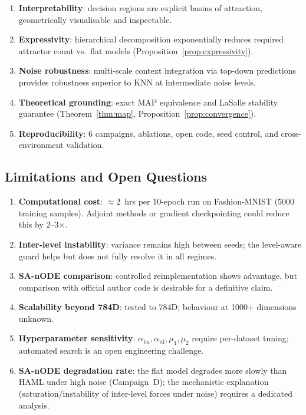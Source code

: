 \documentclass[11pt,a4paper]{article}
\begin{document}
\begin{enumerate}
  \item \textbf{Interpretability}: decision regions are explicit basins of attraction,
        geometrically visualisable and inspectable.
  \item \textbf{Expressivity}: hierarchical decomposition exponentially reduces required
        attractor count vs.\ flat models (Proposition~\ref{prop:expressivity}).
  \item \textbf{Noise robustness}: multi-scale context integration via top-down predictions
        provides robustness superior to KNN at intermediate noise levels.
  \item \textbf{Theoretical grounding}: exact MAP equivalence and LaSalle stability guarantee
        (Theorem~\ref{thm:map}, Proposition~\ref{prop:convergence}).
  \item \textbf{Reproducibility}: 6 campaigns, ablations, open code, seed control, and
        cross-environment validation.
\end{enumerate}

\subsection{Limitations and Open Questions}

\begin{enumerate}
  \item \textbf{Computational cost}: $\approx$2~hrs per 10-epoch run on Fashion-MNIST
        (5000 training samples).  Adjoint methods or gradient checkpointing could reduce
        this by 2--3$\times$.
  \item \textbf{Inter-level instability}: variance remains high between seeds; the level-aware
        guard helps but does not fully resolve it in all regimes.
  \item \textbf{SA-nODE comparison}: controlled reimplementation shows advantage, but comparison
        with official author code is desirable for a definitive claim.
  \item \textbf{Scalability beyond 784D}: tested to 784D; behaviour at 1000$+$ dimensions unknown.
  \item \textbf{Hyperparameter sensitivity}: $\alpha_{\mathrm{bu}}, \alpha_{\mathrm{td}}, \mu_1,
        \mu_2$ require per-dataset tuning; automated search is an open engineering challenge.
  \item \textbf{SA-nODE degradation rate}: the flat model degrades more slowly than HAML under
        high noise (Campaign~D); the mechanistic explanation (saturation/instability of inter-level
        forces under noise) requires a dedicated analysis.
\end{enumerate}
\end{document}
